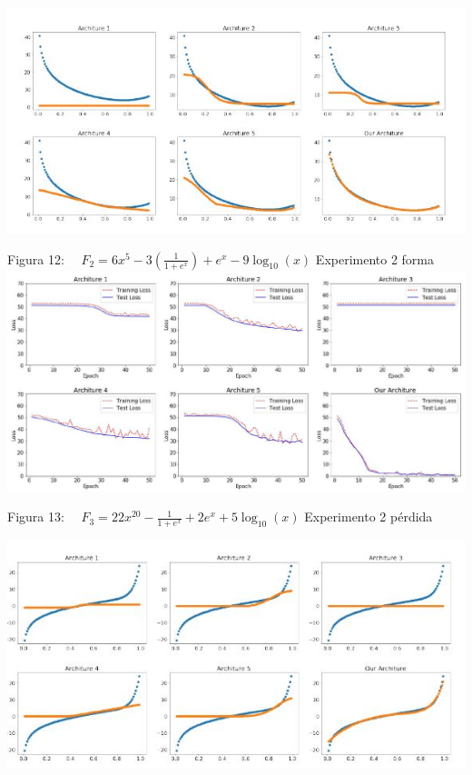 \documentclass[10pt]{article}
\begin{document}
\includegraphics[max width=\textwidth]{2022_09_28_0067ec14010042dbf918g-12(1)}

Figura 12: $\quad F_{2}=6 x^{5}-3\left(\frac{1}{1+e^{x}}\right)+e^{x}-9 \log _{10}(x)$ Experimento 2 forma\\

\includegraphics[max width=\textwidth]{2022_09_28_0067ec14010042dbf918g-13}

Figura 13: $\quad F_{3}=22 x^{20}-\frac{1}{1+e^{x}}+2 e^{x}+5 \log _{10}(x)$ Experimento 2 pérdida

\includegraphics[max width=\textwidth]{2022_09_28_0067ec14010042dbf918g-13(1)}
\end{document}
